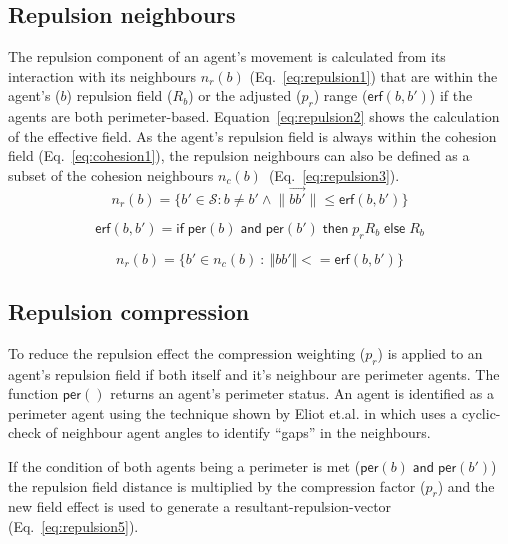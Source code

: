 \documentclass[12pt,a4paper]{article}
\newcommand{\magn}[1]{\Vert{#1}\Vert}
\begin{document}
\subsection{Repulsion neighbours}\label{repulsion:neighbours}
The repulsion component of an agent's movement is calculated from its interaction with its neighbours $n_r(b)$ (Eq.~\ref{eq:repulsion1}) that are within the agent's ($b$) repulsion field ($R_b$) or the adjusted ($p_r$) range ($\mathsf{erf}(b,b')$) if the agents are both perimeter-based. Equation~\ref{eq:repulsion2} shows the calculation of the effective field. As the agent's repulsion field is always within the cohesion field (Eq.~\ref{eq:cohesion1}), the repulsion neighbours can also be defined as a subset of the cohesion neighbours $n_c(b)$~(Eq.~\ref{eq:repulsion3}).\\

\begin{equation}\label{eq:repulsion1}
n_r(b) = \{b' \in \mathcal{S} : b \neq b' \land \lVert\vec{b b'}\rVert \leq \mathsf{erf}(b,b')\}
\end{equation}

\begin{equation}\label{eq:repulsion2}
\mathsf{erf}(b, b') = \mathsf{if} \;
\mathsf{per}(b) \; \mathsf{and} \; \mathsf{per}(b') \; \mathsf{then} \;
p_rR_b \; \mathsf{else} \; R_b
\end{equation}

\begin{equation}\label{eq:repulsion3}
n_r(b) = \{b' \in n_c(b)~:~\magn{bb'} <= \mathsf{erf}(b,b')\}
\end{equation}

\subsection{Repulsion compression}\label{repulsion:compression}
To reduce the repulsion effect the compression weighting ($p_r$) is applied to an agent's repulsion field if both itself and it's neighbour are perimeter agents. The function $\mathsf{per}()$ returns an agent's perimeter status. An agent is identified as a perimeter agent using the technique shown by Eliot et.al. in \cite{eliot2019void} which uses a cyclic-check of neighbour agent angles to identify ``gaps'' in the neighbours.

If the condition of both agents being a perimeter is met ($\mathsf{per}(b) \; \mathsf{and} \; \mathsf{per}(b')$) the repulsion field distance is multiplied by the compression factor ($p_r$) and the new field effect is used to generate a resultant-repulsion-vector (Eq.~\ref{eq:repulsion5}). 
\end{document}
